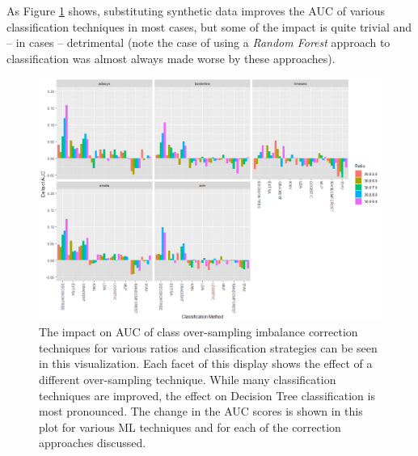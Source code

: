 \documentclass[letterpaper, notitlepage]{report}
\begin{document}
As Figure \ref{fig:imbalance} shows, substituting synthetic data improves the AUC of various classification techniques in most cases, but some of the impact is quite trivial and -- in cases -- detrimental (note the case of using a \textit{Random Forest} approach to classification was almost always made worse by these approaches). 
%
%
%
%
%
%
\begin{figure}[H]
	\centering
	\includegraphics[width=0.9\linewidth]{./figures/imbalance.png}
	\caption[Class imbalance correction techniques]{The impact on AUC of class over-sampling imbalance correction techniques for various ratios and classification strategies can be seen in this visualization. Each facet of this display shows the effect of a different over-sampling technique. While many classification techniques are improved, the effect on Decision Tree classification is most pronounced. The change in the AUC scores is shown in this plot for various ML techniques and for each of the correction approaches discussed.}
	\label{fig:imbalance}
\end{figure}
\end{document}
